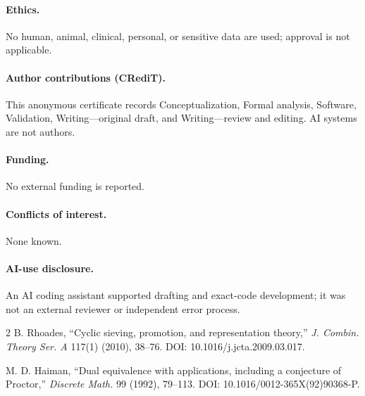 \documentclass[9pt]{extarticle}
\begin{document}
\paragraph{Ethics.} No human, animal, clinical, personal, or sensitive data
are used; approval is not applicable.
\paragraph{Author contributions (CRediT).} This anonymous certificate records
Conceptualization, Formal analysis, Software, Validation, Writing---original
draft, and Writing---review and editing. AI systems are not authors.
\paragraph{Funding.} No external funding is reported.
\paragraph{Conflicts of interest.} None known.
\paragraph{AI-use disclosure.} An AI coding assistant supported drafting and
exact-code development; it was not an external reviewer or independent error
process.

\begin{thebibliography}{2}
 B. Rhoades,
``Cyclic sieving, promotion, and representation theory,''
\emph{J. Combin. Theory Ser. A} 117(1) (2010), 38--76.
DOI: 10.1016/j.jcta.2009.03.017.

 M. D. Haiman,
``Dual equivalence with applications, including a conjecture of Proctor,''
\emph{Discrete Math.} 99 (1992), 79--113.
DOI: 10.1016/0012-365X(92)90368-P.
\end{thebibliography}
\end{document}
